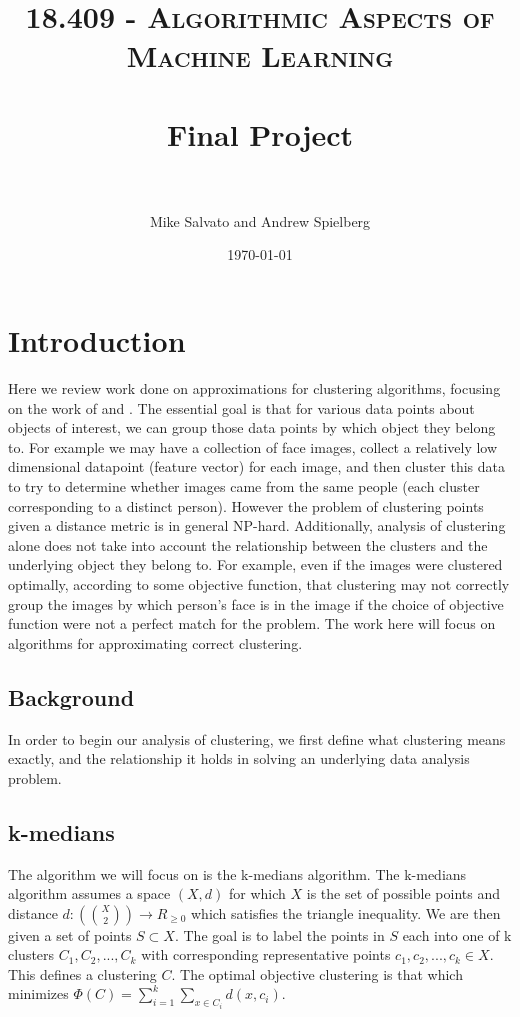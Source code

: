 \documentclass[paper=a4, fontsize=10.5pt]{scrartcl} %
\title{	
\normalfont \normalsize 
\textsc{18.409 - Algorithmic Aspects of Machine Learning} \\ [25pt] %
\horrule{0.5pt} \\[0.4cm] %
\huge Final Project \\ %
\horrule{2pt} \\[0.5cm] %
}
\author{Mike Salvato and Andrew Spielberg} %
\date{\normalsize\today} %
\numberwithin{equation}{section} %
\numberwithin{figure}{section} %
\numberwithin{table}{section} %
\begin{document}
\maketitle %

\section{Introduction}

Here we review work done on approximations for clustering algorithms, focusing on the work of \cite{firstpaper} and \cite{secondpaper}. The essential goal is that for various data points about objects of interest, we can group those data points by which object they belong to. For example we may have a collection of face images, collect a relatively low dimensional datapoint (feature vector) for each image, and then cluster this data to try to determine whether images came from the same people (each cluster corresponding to a distinct person). However the problem of clustering points given a distance metric is in general NP-hard. Additionally, analysis of clustering alone does not take into account the relationship between the clusters and the underlying object they belong to. For example, even if the images were clustered optimally, according to some objective function, that clustering may not correctly group the images by which person's face is in the image if the choice of objective function were not a perfect match for the problem. The work here will focus on algorithms for approximating correct clustering.

\subsection{Background}

In order to begin our analysis of clustering, we first define what clustering means exactly, and the relationship it holds in solving an underlying data analysis problem. 

\subsection{k-medians}
The algorithm we will focus on is the k-medians algorithm. The k-medians algorithm assumes a space $(X, d)$ for which $X$ is the set of possible points and distance $d : ({ X \choose 2}) \rightarrow R_{\geq 0}$ which satisfies the triangle inequality. We are then given a set of points $S \subset X$. The goal is to label the points in $S$ each into one of k clusters $C_1, C_2, ..., C_k$ with corresponding representative points $c_1, c_2, ..., c_k \in X$. This defines a clustering $C$. The optimal objective clustering is that which minimizes $\Phi(C) = \sum\limits_{i = 1}^k \sum_{x \in C_i} d(x, c_i)$.
\end{document}
